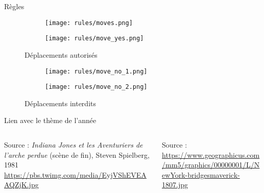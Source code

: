     \begin{frame}{Règles}

        \begin{figure}
            \begin{subfigure}[b]{0.4\textwidth}
                \centering
                \texttt{[image: rules/moves.png]}
            \end{subfigure}
            \hfill
            \begin{subfigure}[b]{0.4\textwidth}
                \centering
                \texttt{[image: rules/move\_yes.png]}
            \end{subfigure}
            \caption*{Déplacements autorisés}
        \end{figure}

         \begin{figure}
            \begin{subfigure}[b]{0.4\textwidth}
                \centering
                \texttt{[image: rules/move\_no\_1.png]}
            \end{subfigure}
            \hfill
            \begin{subfigure}[b]{0.4\textwidth}
                \centering
                \texttt{[image: rules/move\_no\_2.png]}
            \end{subfigure}
            \caption*{Déplacements interdits}
        \end{figure}
    \end{frame}

    \begin{frame}{Lien avec le thème de l'année}
        \centering
        \begin{columns}
            \begin{column}{0.5\textwidth}
                {Source : \textit{Indiana Jones et les Aventuriers de l'arche perdue} (scène de fin), Steven Spielberg, 1981
                    \url{https://pbs.twimg.com/media/EyjVShEVEAAQZjK.jpg}}%
            \end{column}
            \begin{column}{0.5\textwidth}
                {Source : \url{https://www.geographicus.com/mm5/graphics/00000001/L/NewYork-bridgesmaverick-1807.jpg}}%
            \end{column}
        \end{columns}
    \end{frame}

